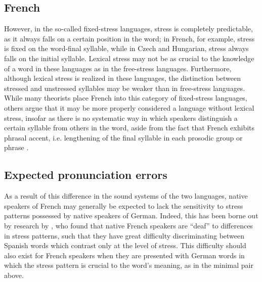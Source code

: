 	\subsection{French}
	\label{sec:stress:french}

			However, in the so-called fixed-stress languages, stress is completely predictable, as it always falls on a certain position in the word;
in French, for example, stress is fixed on the word-final syllable, while 
in Czech and Hungarian, stress always falls on the initial syllable. Lexical stress may not be as crucial to the knowledge of a word in these languages as in the free-stress languages. Furthermore, although lexical stress is realized in these languages, the distinction between stressed and unstressed syllables may be weaker than in free-stress languages.
%
 While many theorists place French 
 into this category of fixed-stress languages, 
 others argue that
 it may be more properly considered a language without lexical stress, insofar as there is no systematic way in which speakers distinguish a certain syllable from others in the word, aside from the fact that French exhibits phrasal accent, i.e. lengthening of the final syllable in each prosodic group or phrase \citep{Dupoux2008}. %
			
		\subsection{Expected pronunciation errors}
		\label{sec:stress:expected}
		As a result of this difference in the sound systems of the two languages,
		native speakers of French may generally be expected to lack the sensitivity to stress patterns possessed by native speakers of German. Indeed, this has been borne out by research by \textcite{Dupoux2008},
  who found that native French speakers are ``deaf'' to differences in stress patterns, such that they have great difficulty discriminating between Spanish words which contrast only at the level of stress. This difficulty should also exist for French speakers when they are presented with German words in which the stress pattern is crucial to the word's meaning, as in the minimal pair above. 

		
		
